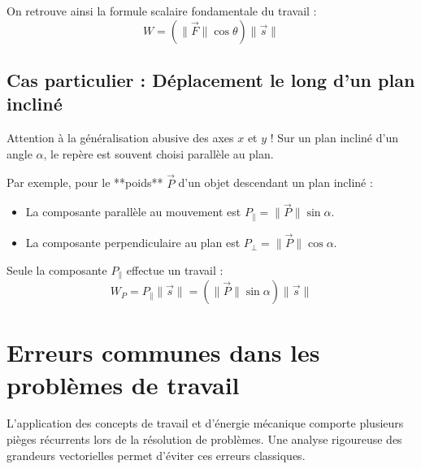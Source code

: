 \documentclass[11pt,openany]{book}
\begin{document}
On retrouve ainsi la formule scalaire fondamentale du travail :
\[
\boxed{W = (\|\vec{F}\| \cos\theta) \|\vec{s}\|}
\]

\subsection*{Cas particulier : Déplacement le long d'un plan incliné}

Attention à la généralisation abusive des axes $x$ et $y$ ! Sur un plan incliné d'un angle $\alpha$, le repère est souvent choisi parallèle au plan. 

Par exemple, pour le **poids** $\vec{P}$ d'un objet descendant un plan incliné :
\begin{itemize}
    \item La composante parallèle au mouvement est $P_{\parallel} = \|\vec{P}\| \sin\alpha$.
    \item La composante perpendiculaire au plan est $P_{\perp} = \|\vec{P}\| \cos\alpha$.
\end{itemize}

Seule la composante $P_{\parallel}$ effectue un travail :
\[
W_P = P_{\parallel} \|\vec{s}\| = (\|\vec{P}\| \sin\alpha) \|\vec{s}\|
\]

\begin{center}
\setlength{\fboxsep}{10pt}
\end{center}
\section{Erreurs communes dans les problèmes de travail}

L'application des concepts de travail et d'énergie mécanique comporte plusieurs pièges récurrents lors de la résolution de problèmes. Une analyse rigoureuse des grandeurs vectorielles permet d'éviter ces erreurs classiques.
\end{document}
